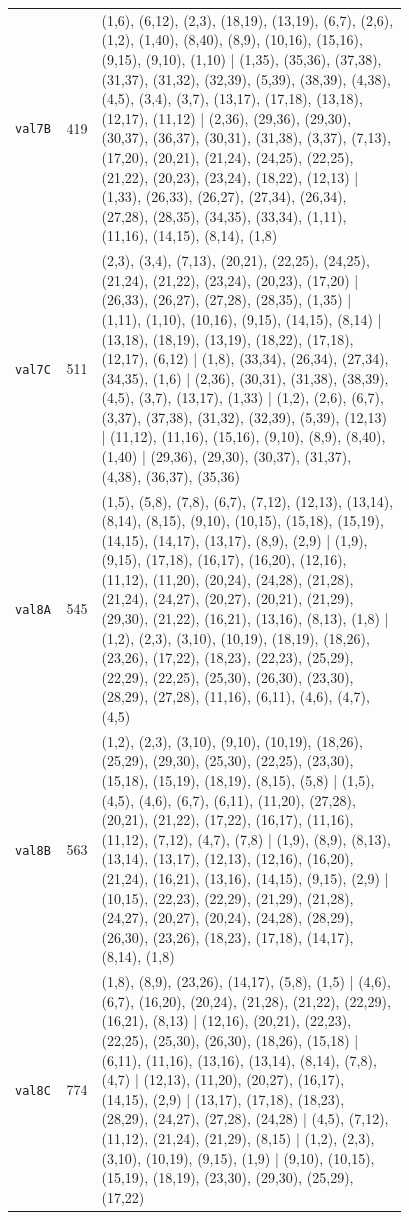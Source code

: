\begin{landscape}
\begin{longtable}{lr>{\tiny\raggedright\arraybackslash}p{0.78\linewidth}}
\texttt{val7B} & 419 & (1,6), (6,12), (2,3), (18,19), (13,19), (6,7), (2,6), (1,2), (1,40), (8,40), (8,9), (10,16), (15,16), (9,15), (9,10), (1,10) | (1,35), (35,36), (37,38), (31,37), (31,32), (32,39), (5,39), (38,39), (4,38), (4,5), (3,4), (3,7), (13,17), (17,18), (13,18), (12,17), (11,12) | (2,36), (29,36), (29,30), (30,37), (36,37), (30,31), (31,38), (3,37), (7,13), (17,20), (20,21), (21,24), (24,25), (22,25), (21,22), (20,23), (23,24), (18,22), (12,13) | (1,33), (26,33), (26,27), (27,34), (26,34), (27,28), (28,35), (34,35), (33,34), (1,11), (11,16), (14,15), (8,14), (1,8) \\[2pt]
\texttt{val7C} & 511 & (2,3), (3,4), (7,13), (20,21), (22,25), (24,25), (21,24), (21,22), (23,24), (20,23), (17,20) | (26,33), (26,27), (27,28), (28,35), (1,35) | (1,11), (1,10), (10,16), (9,15), (14,15), (8,14) | (13,18), (18,19), (13,19), (18,22), (17,18), (12,17), (6,12) | (1,8), (33,34), (26,34), (27,34), (34,35), (1,6) | (2,36), (30,31), (31,38), (38,39), (4,5), (3,7), (13,17), (1,33) | (1,2), (2,6), (6,7), (3,37), (37,38), (31,32), (32,39), (5,39), (12,13) | (11,12), (11,16), (15,16), (9,10), (8,9), (8,40), (1,40) | (29,36), (29,30), (30,37), (31,37), (4,38), (36,37), (35,36) \\[2pt]
\texttt{val8A} & 545 & (1,5), (5,8), (7,8), (6,7), (7,12), (12,13), (13,14), (8,14), (8,15), (9,10), (10,15), (15,18), (15,19), (14,15), (14,17), (13,17), (8,9), (2,9) | (1,9), (9,15), (17,18), (16,17), (16,20), (12,16), (11,12), (11,20), (20,24), (24,28), (21,28), (21,24), (24,27), (20,27), (20,21), (21,29), (29,30), (21,22), (16,21), (13,16), (8,13), (1,8) | (1,2), (2,3), (3,10), (10,19), (18,19), (18,26), (23,26), (17,22), (18,23), (22,23), (25,29), (22,29), (22,25), (25,30), (26,30), (23,30), (28,29), (27,28), (11,16), (6,11), (4,6), (4,7), (4,5) \\[2pt]
\texttt{val8B} & 563 & (1,2), (2,3), (3,10), (9,10), (10,19), (18,26), (25,29), (29,30), (25,30), (22,25), (23,30), (15,18), (15,19), (18,19), (8,15), (5,8) | (1,5), (4,5), (4,6), (6,7), (6,11), (11,20), (27,28), (20,21), (21,22), (17,22), (16,17), (11,16), (11,12), (7,12), (4,7), (7,8) | (1,9), (8,9), (8,13), (13,14), (13,17), (12,13), (12,16), (16,20), (21,24), (16,21), (13,16), (14,15), (9,15), (2,9) | (10,15), (22,23), (22,29), (21,29), (21,28), (24,27), (20,27), (20,24), (24,28), (28,29), (26,30), (23,26), (18,23), (17,18), (14,17), (8,14), (1,8) \\[2pt]
\texttt{val8C} & 774 & (1,8), (8,9), (23,26), (14,17), (5,8), (1,5) | (4,6), (6,7), (16,20), (20,24), (21,28), (21,22), (22,29), (16,21), (8,13) | (12,16), (20,21), (22,23), (22,25), (25,30), (26,30), (18,26), (15,18) | (6,11), (11,16), (13,16), (13,14), (8,14), (7,8), (4,7) | (12,13), (11,20), (20,27), (16,17), (14,15), (2,9) | (13,17), (17,18), (18,23), (28,29), (24,27), (27,28), (24,28) | (4,5), (7,12), (11,12), (21,24), (21,29), (8,15) | (1,2), (2,3), (3,10), (10,19), (9,15), (1,9) | (9,10), (10,15), (15,19), (18,19), (23,30), (29,30), (25,29), (17,22) \\[2pt]

\end{longtable}
\end{landscape}
